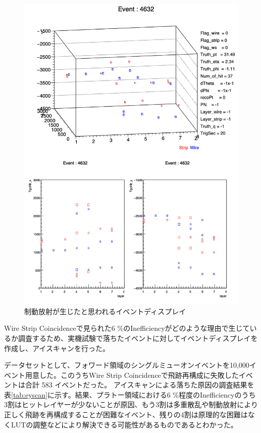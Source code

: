 \begin{figure} 
\centering
\includegraphics[width=16cm]{fig/Test/Brems.png}
\caption[制動放射が生じたと思われるイベントディスプレイ]{制動放射が生じたと思われるイベントディスプレイ}
\label{Brems}
\end{figure}

Wire Strip Coincidenceで見られた6 \%のInefficiencyがどのような理由で生じているか調査するため、実機試験で落ちたイベントに対してイベントディスプレイを作成し、アイスキャンを行った。

データセットとして、フォワード領域のシングルミューオンイベントを10,000イベント用意した。このうちWire Strip Coincidenceで飛跡再構成に失敗したイベントは合計 583 イベントだった。
アイスキャンによる落ちた原因の調査結果を表\ref{tab:eyscan}に示す。結果、プラトー領域における6 \%程度のInefficiencyのうち3割はヒットレイヤーが少ないことが原因、もう3割は多重散乱や制動放射により正しく飛跡を再構成することが困難なイベント、残りの4割は原理的な困難はなくLUTの調整などにより解決できる可能性があるものであるとわかった。

